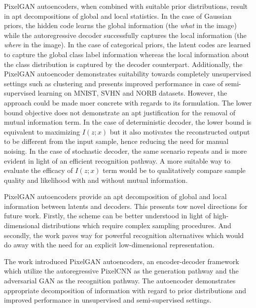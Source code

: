 \documentclass[11pt,letterpaper]{article}
\begin{document}
PixelGAN autoencoders, when combined with suitable prior distributions, result in apt decompositions of global and local statistics. In the case of Gaussian priors, the hidden code learns the global information (the \textit{what} in the image) while the autoregressive decoder successfully captures the local information (the \textit{where} in the image). In the case of categorical priors, the latent codes are learned to capture the global class label information whereas the local information about the class distribution is captured by the decoder counterpart. Additionally, the PixelGAN autoencoder demonstrates suitability towards completely unsupervised settings such as clustering and presents improved performance in case of semi-supervised learning on MNIST, SVHN and NORB datasets. However, the approach could be made moer concrete with regards to its formulation. The lower bound objective does not demonstrate an apt justification for the removal of mutual information term. In the case of deterministic decoder, the lower bound is equivalent to maximizing $I(z;x)$ but it also motivates the reconstructed output to be different from the input sample, hence reducing the need for manual noising. In the case of stochastic decoder, the same scenario repeats and is more evident in light of an efficient recognition pathway. A more suitable way to evaluate the efficacy of $I(z;x)$ term would be to qualitatively compare sample quality and likelihood with and without mutual information.

PixelGAN autoencoders provide an apt decomposition of global and local information between latents and decoders. This presents tow novel directions for future work. Firstly, the scheme can be better understood in light of high-dimensional distributions which require complex sampling procedures. And secondly, the work paves way for powerful recognition alternatives which would do away with the need for an explicit low-dimensional representation. 

The work introduced PixelGAN autoencoders, an encoder-decoder framework which utilize the autoregressive PixelCNN as the generation pathway and the adversarial GAN as the recognition pathway. The autoencoder demonstrates appropriate decomposition of information with regard to prior distributions and improved performance in unsupervised and semi-supervised settings. 
\end{document}
